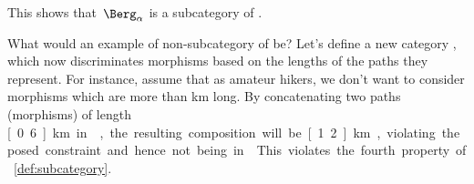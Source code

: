 This shows that~$\Berg_\alpha$ is a subcategory of \Berg.


What would an example of non-subcategory of \Berg be?
Let's define a new category \Berglazy, which now discriminates morphisms based on the lengths of the paths they represent.
For instance, assume that as amateur hikers, we don't want to consider morphisms which are more than \unit[1]{km} long.
By concatenating two paths (morphisms) of length \unit[0.6]{km} in \Berglazy, the resulting composition will be \unit[1.2]{km}, violating the posed constraint and hence not being in \Berglazy.
This violates the fourth property of \cref{def:subcategory}.









